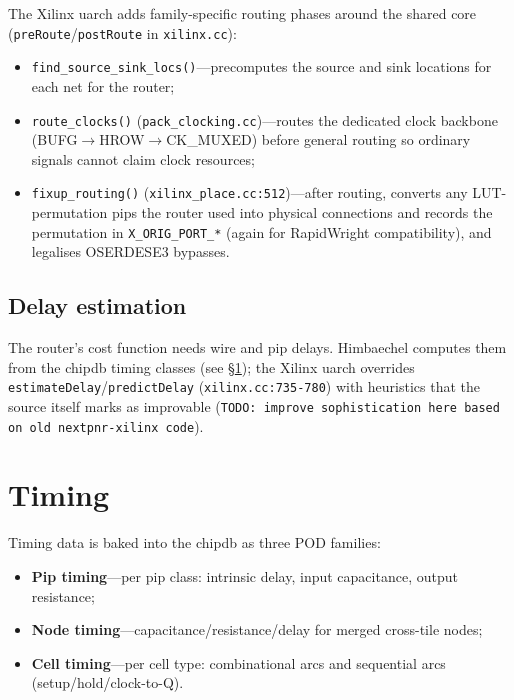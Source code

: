 \documentclass[11pt,a4paper]{article}
\begin{document}
The Xilinx uarch adds family-specific routing phases around the shared
core (\texttt{preRoute}/\texttt{postRoute} in \texttt{xilinx.cc}):

\begin{itemize}
\item \texttt{find\_source\_sink\_locs()}---precomputes the source and
  sink locations for each net for the router;
\item \texttt{route\_clocks()} (\texttt{pack\_clocking.cc})---routes
  the dedicated clock backbone (BUFG$\to$HROW\allowbreak$\to$CK\_MUXED) before
  general routing so ordinary signals cannot claim clock resources;
\item \texttt{fixup\_routing()} (\texttt{xilinx\_place.cc:512})---after
  routing, converts any LUT-permutation pips the router used into
  physical connections and records the permutation in
  \texttt{X\_ORIG\_PORT\_*} (again for RapidWright compatibility), and
  legalises OSERDESE3 bypasses.
\end{itemize}

\subsection{Delay estimation}

The router's cost function needs wire and pip delays. Himbaechel
computes them from the chipdb timing classes (see \S\ref{sec:timing});
the Xilinx uarch overrides \texttt{estimateDelay}/\texttt{predictDelay}
(\texttt{xilinx.cc:735-780}) with heuristics that the source itself
marks as improvable (\texttt{TODO: improve sophistication here based on
old nextpnr-xilinx code}).

\section{Timing}
\label{sec:timing}

Timing data is baked into the chipdb as three POD families:

\begin{itemize}
\item \textbf{Pip timing}---per pip class: intrinsic delay, input
  capacitance, output resistance;
\item \textbf{Node timing}---capacitance/resistance/delay for merged
  cross-tile nodes;
\item \textbf{Cell timing}---per cell type: combinational arcs and
  sequential arcs (setup/hold/clock-to-Q).
\end{itemize}
\end{document}
